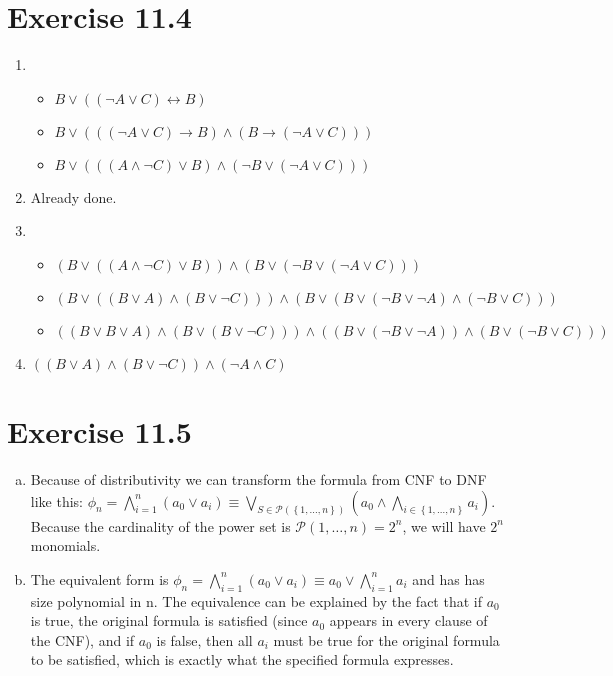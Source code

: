 \documentclass{article} %
\newcommand{\homeworkNumber}{11}
\begin{document}
\section*{Exercise \homeworkNumber.4}
\begin{enumerate}[Step(1)]
	\item
	\begin{itemize}
		\item
		$B \lor ((\neg A \lor C) \leftrightarrow B)$
		\item
		$B \lor (((\neg A \lor C)\rightarrow  B) \land (B \rightarrow (\neg A \lor C)))$
		\item 
		$B \lor ((( A \land \neg C) \lor  B) \land (\neg B \lor (\neg A \lor C)))$
	\end{itemize}
	\item
	Already done.
	\item 
	\begin{itemize}
		\item 
		$ (B\lor ((A \land \neg C)\lor B)) \land ( B \lor ( \neg B \lor ( \neg A \lor C))) $
		
		\item 
		$ (B\lor ((B \lor A)\land (B\lor \neg C))) \land ( B \lor ( B \lor (\neg B \lor \neg A)\land(\neg B \lor C))) $
		\item 
		$ (( B \lor B \lor A) \land ( B\lor ( B \lor \neg C))) \land ( (B \lor (\neg B \lor \neg A)) \land (B \lor  ( \neg B \lor C)))$
	\end{itemize}
		\item 
		$ ((B \lor A) \land ( B \lor \neg C)) \land (\neg A \land C)$




\end{enumerate}


\section*{Exercise \homeworkNumber.5}
\begin{enumerate}[(a)]
	\item Because of distributivity we can transform the formula from CNF to DNF like this: \( \phi_n = \bigwedge\limits_{i=1}^{n}(a_{0} \lor a_i) \equiv \bigvee\limits_{S \in \mathcal{P}(\left\{ 1, \ldots ,n \right\} )}(a_{0} \land \bigwedge\limits_{i \in \left\{ 1, \ldots ,n \right\} } a_{i})\). Because the cardinality of the power set is \( \mathcal{P}({1,\ldots ,n}) = 2^n \), we will have \( 2^n \) monomials.
	\item The equivalent form is \( \phi_n = \bigwedge\limits_{i=1}^{n}(a_{0} \lor a_i) \equiv a_{0} \lor \bigwedge\limits_{i=1}^{n}a_{i}\) and has has size polynomial in n. The equivalence can be explained by the fact that if \( a_{0} \) is true, the original formula is satisfied (since \( a_{0} \) appears in every clause of the CNF), and if \( a_{0} \) is false, then all \( a_i \) must be true for the original formula to be satisfied, which is exactly what the specified formula expresses.

\end{enumerate}
\end{document}
